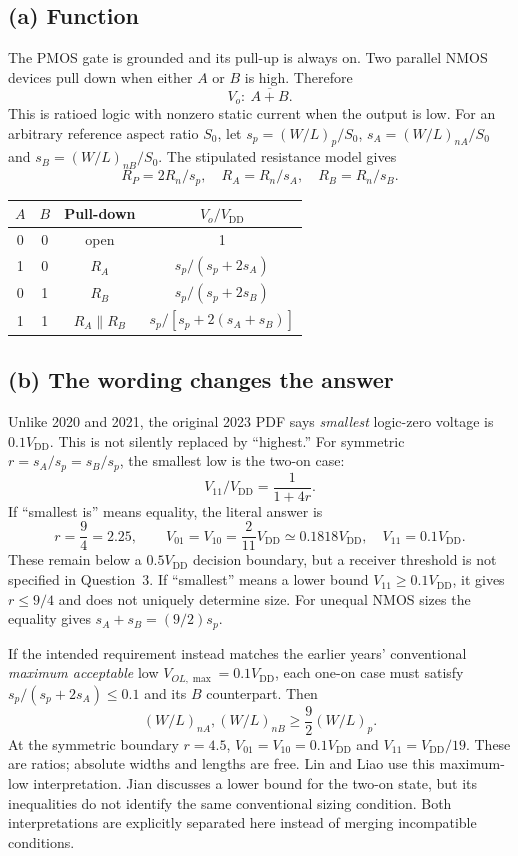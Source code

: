 \documentclass[11pt,a4paper]{article}
\newcommand{\VDD}{V_{\mathrm{DD}}}
\begin{document}
\subsection*{(a) Function}
The PMOS gate is grounded and its pull-up is always on. Two parallel NMOS
devices pull down when either $A$ or $B$ is high. Therefore
\[
 \boxed{V_o:\ \overline{A+B}.}
\]
This is ratioed logic with nonzero static current when the output is low.
For an arbitrary reference aspect ratio $S_0$, let
$s_p=(W/L)_p/S_0$, $s_A=(W/L)_{nA}/S_0$ and $s_B=(W/L)_{nB}/S_0$.
The stipulated resistance model gives
\[
 R_P=2R_n/s_p,\quad R_A=R_n/s_A,\quad R_B=R_n/s_B.
\]
\begin{center}\begin{tabular}{cccc}
\toprule $A$&$B$&Pull-down&$V_o/\VDD$\\\midrule
0&0&open&1\\
1&0&$R_A$&$s_p/(s_p+2s_A)$\\
0&1&$R_B$&$s_p/(s_p+2s_B)$\\
1&1&$R_A\parallel R_B$&$s_p/[s_p+2(s_A+s_B)]$\\\bottomrule
\end{tabular}\end{center}
\subsection*{(b) The wording changes the answer}
Unlike 2020 and 2021, the original 2023 PDF says \emph{smallest} logic-zero
voltage is $0.1\VDD$. This is not silently replaced by ``highest.''
For symmetric $r=s_A/s_p=s_B/s_p$, the smallest low is the two-on case:
\[
 V_{11}/\VDD=\frac1{1+4r}.
\]
If ``smallest is'' means equality, the literal answer is
\[
 \boxed{r=\frac94=2.25},\qquad
 V_{01}=V_{10}=\frac{2}{11}\VDD\simeq0.1818\VDD,
 \quad V_{11}=0.1\VDD.
\]
These remain below a $0.5\VDD$ decision boundary, but a receiver threshold
is not specified in Question~3. If ``smallest'' means a lower bound
$V_{11}\geq0.1\VDD$, it gives $r\leq9/4$ and does not uniquely determine size.
For unequal NMOS sizes the equality gives $s_A+s_B=(9/2)s_p$.

If the intended requirement instead matches the earlier years' conventional
\emph{maximum acceptable} low $V_{OL,\max}=0.1\VDD$, each one-on case must
satisfy $s_p/(s_p+2s_A)\leq0.1$ and its $B$ counterpart. Then
\[
 \boxed{(W/L)_{nA},(W/L)_{nB}\geq\frac92(W/L)_p.}
\]
At the symmetric boundary $r=4.5$, $V_{01}=V_{10}=0.1\VDD$ and
$V_{11}=\VDD/19$. These are ratios; absolute widths and lengths are free.
Lin and Liao use this maximum-low interpretation. Jian discusses a lower
bound for the two-on state, but its inequalities do not identify the same
conventional sizing condition. Both interpretations are explicitly separated
here instead of merging incompatible conditions.
\end{document}
